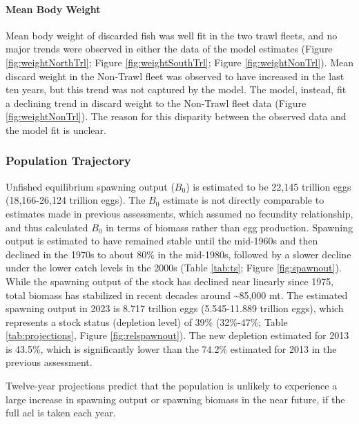 \documentclass[11pt,
  english,
  letterpaper,
]{article}
\begin{document}
\hypertarget{mean-body-weight}{%
\paragraph{Mean Body Weight}\label{mean-body-weight}}

Mean body weight of discarded fish was well fit in the two trawl fleets, and no major trends were observed in either the data of the model estimates (Figure \ref{fig:weightNorthTrl}; Figure \ref{fig:weightSouthTrl}; Figure \ref{fig:weightNonTrl}). Mean discard weight in the Non-Trawl fleet was observed to have increased in the last ten years, but this trend was not captured by the model. The model, instead, fit a declining trend in discard weight to the Non-Trawl fleet data (Figure \ref{fig:weightNonTrl}). The reason for this disparity between the observed data and the model fit is unclear.

\hypertarget{population-trajectory}{%
\subsubsection{Population Trajectory}\label{population-trajectory}}

Unfished equilibrium spawning output (\(B_0\)) is estimated to be 22,145 trillion eggs (18,166-26,124 trillion eggs). The \(B_0\) estimate is not directly comparable to estimates made in previous assessments, which assumed no fecundity relationship, and thus calculated \(B_0\) in terms of biomass rather than egg production. Spawning output is estimated to have remained stable until the mid-1960s and then declined in the 1970s to about 80\% in the mid-1980s, followed by a slower decline under the lower catch levels in the 2000s (Table \ref{tab:ts}; Figure \ref{fig:spawnout}). While the spawning output of the stock has declined near linearly since 1975, total biomass has stabilized in recent decades around \textasciitilde85,000 mt. The estimated spawning output in 2023 is 8.717 trillion eggs (5.545-11.889 trillion eggs), which represents a stock status (depletion level) of 39\% (32\%-47\%; Table \ref{tab:projections}, Figure \ref{fig:relspawnout}). The new depletion estimated for 2013 is 43.5\%, which is significantly lower than the 74.2\% estimated for 2013 in the previous assessment.

Twelve-year projections predict that the population is unlikely to experience a large increase in spawning output or spawning biomass in the near future, if the full \gls{acl} is taken each year.
\end{document}
